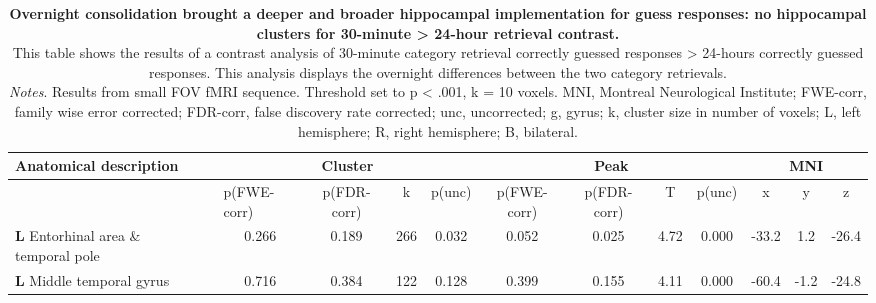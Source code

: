 \begin{landscape}
\begin{table}[!ht]
    \vspace*{-4cm}
    \raggedright
  \begin{tabular}{ll|cccc|cccc|ccc} \\ \hline
        \multicolumn{2}{l}{\textbf{Anatomical description}} & \multicolumn{4}{c}{\textbf{Cluster}} & \multicolumn{4}{c}{\textbf{Peak}} &  \multicolumn{3}{c}{\textbf{MNI}} \\ \hline
        \multicolumn{2}{l}{\textbf{}} & \multicolumn{1}{l}{p(FWE-corr)} & p(FDR-corr) & k & \multicolumn{1}{l}{p(unc)} & p(FWE-corr) & p(FDR-corr) & T & \multicolumn{1}{l}{p(unc)} & x & y & z \\ \hline
        \textbf{L} Entorhinal area \& temporal pole & & 0.266 & 0.189 & 266 & 0.032 & 0.052 & 0.025 & 4.72 & 0.000 & -33.2 & 1.2 & -26.4 \\
        \textbf{L} Middle temporal gyrus & & 0.716 & 0.384 & 122 & 0.128 & 0.399 & 0.155 & 4.11 & 0.000 & -60.4 & -1.2 & -24.8 \\ \hline
    \end{tabular}
    \vspace{1.0 em}
    \caption{\textbf{Overnight consolidation brought a deeper and broader hippocampal implementation for guess responses: no hippocampal clusters for 30-minute > 24-hour retrieval contrast.} \\ This table shows the results of a contrast analysis of 30-minute category retrieval correctly guessed responses > 24-hours correctly guessed responses. This analysis displays the overnight differences between the two category retrievals.  \\ 
    \vspace{1.0 em} \textit{Notes}. Results from small FOV fMRI sequence. Threshold set to p < .001, k = 10 voxels. MNI, Montreal Neurological Institute; FWE-corr, family wise error corrected; FDR-corr, false discovery rate corrected; unc, uncorrected;  g, gyrus; k, cluster size in number of voxels; L, left hemisphere; R, right hemisphere; B, bilateral.}
     \label{tab:Unc_Ret1_vs_Ret2}
\end{table}
\end{landscape}